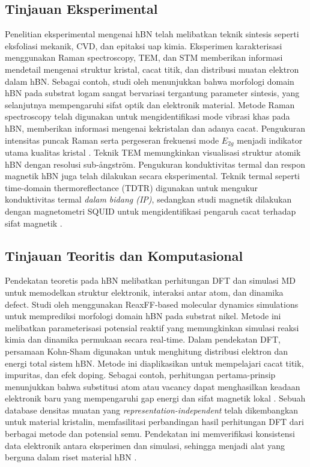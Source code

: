 \subsection{Tinjauan Eksperimental}
Penelitian eksperimental mengenai hBN telah melibatkan teknik sintesis seperti eksfoliasi mekanik, CVD, dan epitaksi uap kimia.
Eksperimen karakterisasi menggunakan Raman spectroscopy, TEM, dan STM memberikan informasi mendetail mengenai struktur kristal, cacat titik, dan distribusi muatan elektron dalam hBN.
Sebagai contoh, studi oleh \citep{Bhimanapati2016} menunjukkan bahwa morfologi domain hBN pada substrat logam sangat bervariasi tergantung parameter sintesis, yang selanjutnya mempengaruhi sifat optik dan elektronik material.
Metode Raman spectroscopy telah digunakan untuk mengidentifikasi mode vibrasi khas pada hBN, memberikan informasi mengenai kekristalan dan adanya cacat.
Pengukuran intensitas puncak Raman serta pergeseran frekuensi mode \(E_{2g}\) menjadi indikator utama kualitas kristal \citep{Wang2017}.
Teknik TEM memungkinkan visualisasi struktur atomik hBN dengan resolusi sub-ångström.
Pengukuran konduktivitas termal dan respon magnetik hBN juga telah dilakukan secara eksperimental.
Teknik termal seperti time-domain thermoreflectance (TDTR) digunakan untuk mengukur konduktivitas termal \emph{dalam bidang (IP)}, sedangkan studi magnetik dilakukan dengan magnetometri SQUID untuk mengidentifikasi pengaruh cacat terhadap sifat magnetik \citep{Zhang2020}.

\subsection{Tinjauan Teoritis dan Komputasional}
Pendekatan teoretis pada hBN melibatkan perhitungan DFT dan simulasi MD untuk memodelkan struktur elektronik, interaksi antar atom, dan dinamika defect.
Studi oleh \citep{Lele2022} menggunakan ReaxFF-based molecular dynamics simulations untuk memprediksi morfologi domain hBN pada substrat nikel.
Metode ini melibatkan parameterisasi potensial reaktif yang memungkinkan simulasi reaksi kimia dan dinamika permukaan secara real-time.
Dalam pendekatan DFT, persamaan Kohn-Sham digunakan untuk menghitung distribusi elektron dan energi total sistem hBN.
Metode ini diaplikasikan untuk mempelajari cacat titik, impuritas, dan efek doping.
Sebagai contoh, perhitungan pertama-prinsip menunjukkan bahwa substitusi atom atau vacancy dapat menghasilkan keadaan elektronik baru yang mempengaruhi gap energi dan sifat magnetik lokal \citep{Zhang2020}.
Sebuah database densitas muatan yang \emph{representation-independent} telah dikembangkan untuk material kristalin, memfasilitasi perbandingan hasil perhitungan DFT dari berbagai metode dan potensial semu.
Pendekatan ini memverifikasi konsistensi data elektronik antara eksperimen dan simulasi, sehingga menjadi alat yang berguna dalam riset material hBN \citep{Shen2022}.

